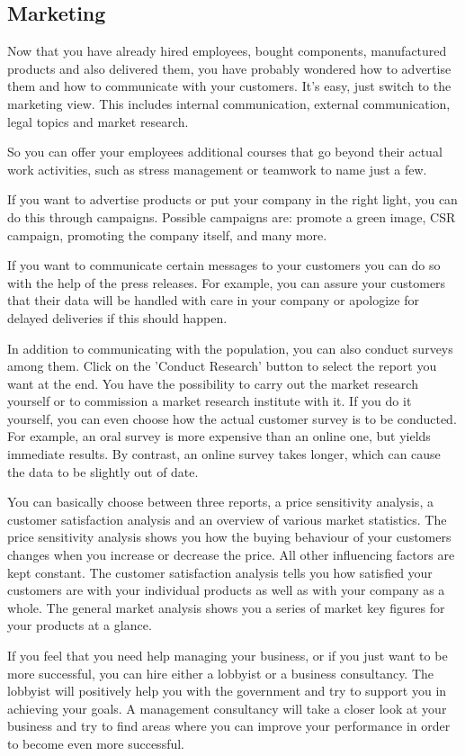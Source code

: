 \subsection{Marketing} \label{marketing_manual}


Now that you have already hired employees, bought components, manufactured products and also delivered them, you have probably wondered how to advertise them and how to communicate with your customers. It's easy, just switch to the marketing view. This includes internal communication, external communication, legal topics and market research.

So you can offer your employees additional courses that go beyond their actual work activities, such as stress management or teamwork to name just a few.

If you want to advertise products or put your company in the right light, you can do this through campaigns. Possible campaigns are: promote a green image, CSR campaign, promoting the company itself, and many more.

If you want to communicate certain messages to your customers you can do so with the help of the press releases. For example, you can assure your customers that their data will be handled with care in your company or apologize for delayed deliveries if this should happen.

In addition to communicating with the population, you can also conduct surveys among them. Click on the 'Conduct Research' button to select the report you want at the end. You have the possibility to carry out the market research yourself or to commission a market research institute with it. If you do it yourself, you can even choose how the actual customer survey is to be conducted. For example, an oral survey is more expensive than an online one, but yields immediate results.  By contrast, an online survey takes longer, which can cause the data to be slightly out of date.

You can basically choose between three reports, a price sensitivity analysis, a customer satisfaction analysis and an overview of various market statistics. The price sensitivity analysis shows you how the buying behaviour of your customers changes when you increase or decrease the price. All other influencing factors are kept constant. The customer satisfaction analysis tells you how satisfied your customers are with your individual products as well as with your company as a whole. The general market analysis shows you a series of market key figures for your products at a glance. 

If you feel that you need help managing your business, or if you just want to be more successful, you can hire either a lobbyist or a business consultancy. The lobbyist will positively help you with the government and try to support you in achieving your goals. 
A management consultancy will take a closer look at your business and try to find areas where you can improve your performance in order to become even more successful.